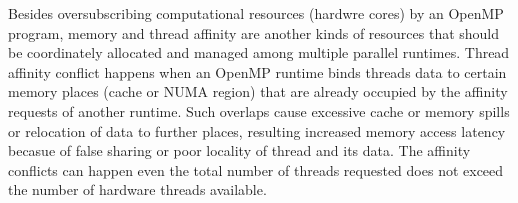 Besides oversubscribing computational resources (hardwre cores) by an OpenMP program, 
memory and thread affinity are another kinds of resources that should be coordinately allocated and managed among
multiple parallel runtimes. %
Thread affinity conflict happens when an OpenMP runtime binds threads data to 
certain memory places (cache or NUMA region) that are already occupied by 
the affinity requests of another runtime. Such overlaps cause excessive cache or memory spills or relocation of data
to further places, resulting increased memory access latency becasue of false sharing or 
poor locality of thread and its data. %
The affinity conflicts can happen even the total number of threads requested does not exceed the number of hardware threads available.

